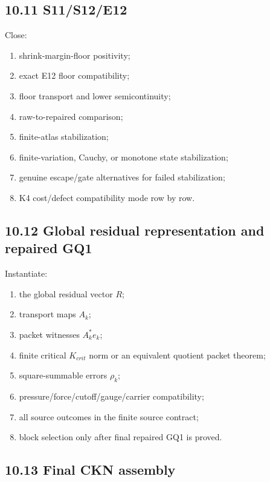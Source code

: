 \documentclass[11pt]{article}
\begin{document}
\subsection*{10.11 S11/S12/E12}

Close:

\begin{enumerate}
\item
  shrink-margin-floor positivity;
\item
  exact E12 floor compatibility;
\item
  floor transport and lower semicontinuity;
\item
  raw-to-repaired comparison;
\item
  finite-atlas stabilization;
\item
  finite-variation, Cauchy, or monotone state stabilization;
\item
  genuine escape/gate alternatives for failed stabilization;
\item
  K4 cost/defect compatibility mode row by row.
\end{enumerate}

\subsection*{10.12 Global residual representation and repaired GQ1}

Instantiate:

\begin{enumerate}
\item
  the global residual vector \(R\);
\item
  transport maps \(A_k\);
\item
  packet witnesses \(A_k^*e_k\);
\item
  finite critical \(K_{crit}\) norm or an equivalent quotient packet theorem;
\item
  square-summable errors \(\rho_k\);
\item
  pressure/force/cutoff/gauge/carrier compatibility;
\item
  all source outcomes in the finite source contract;
\item
  block selection only after final repaired GQ1 is proved.
\end{enumerate}

\subsection*{10.13 Final CKN assembly}
\end{document}
